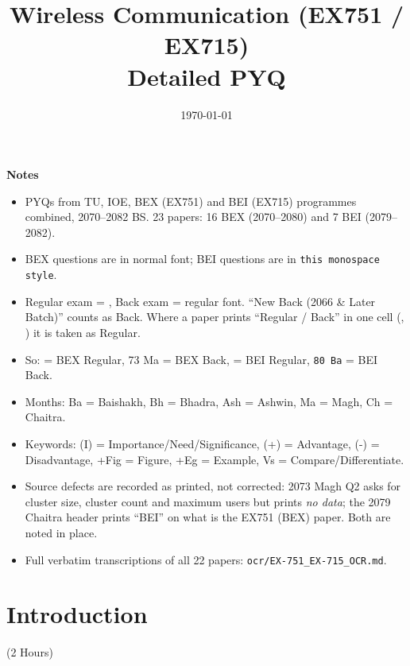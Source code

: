 \documentclass[12pt]{article}
\title{Wireless Communication (EX751 / EX715)\\[0.4em]\large Detailed PYQ}
\author{}
\date{\today}
\begin{document}
\maketitle
\vspace{5cm}
\textbf{Notes}
\begin{itemize}[noitemsep]
  \item PYQs from TU, IOE, BEX (EX751) and BEI (EX715) programmes combined, 2070--2082 BS. 23 papers: 16 BEX (2070--2080) and 7 BEI (2079--2082).
  \item BEX questions are in normal font; BEI questions are in \texttt{this monospace style}.
  \item Regular exam = , Back exam = regular font. ``New Back (2066 \& Later Batch)'' counts as Back. Where a paper prints ``Regular / Back'' in one cell (, ) it is taken as Regular.
  \item So:  = BEX Regular, 73 Ma = BEX Back,  = BEI Regular, \texttt{80 Ba} = BEI Back.
  \item Months: Ba = Baishakh, Bh = Bhadra, Ash = Ashwin, Ma = Magh, Ch = Chaitra.
  \item Keywords: (I) = Importance/Need/Significance, (+) = Advantage, (-) = Disadvantage, +Fig = Figure, +Eg = Example, Vs = Compare/Differentiate.
  \item Source defects are recorded as printed, not corrected: 2073 Magh Q2 asks for cluster size, cluster count and maximum users but prints \emph{no data}; the 2079 Chaitra header prints ``BEI'' on what is the EX751 (BEX) paper. Both are noted in place.
  \item Full verbatim transcriptions of all 22 papers: \texttt{ocr/EX-751\_EX-715\_OCR.md}.
\end{itemize}
\pagebreak
\tableofcontents
\pagebreak

\section{Introduction}
\begin{center}(2 Hours)\end{center}
\end{document}
